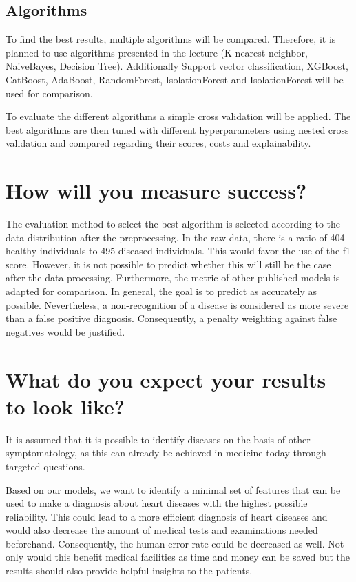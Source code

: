 \documentclass[11pt,titlepage,oneside,openany]{book}
\begin{document}
\subsection{Algorithms}

To find the best results, multiple algorithms will be compared. Therefore, it is planned to use algorithms presented in the lecture (K-nearest neighbor, NaiveBayes, Decision Tree). Additionally Support vector classification, XGBoost, CatBoost, AdaBoost, RandomForest, IsolationForest and IsolationForest  will be used for comparison.

To evaluate the different algorithms a simple cross validation will be applied. The best algorithms are then tuned with different hyperparameters using nested cross validation and compared regarding their scores, costs and explainability. 

\section{How will you measure success?}
\label{sec:success}

The evaluation method to select the best algorithm is selected according to the data distribution after the  preprocessing. In the raw data, there is a ratio of 404 healthy individuals to 495 diseased individuals. This would favor the use of the f1 score. However, it is not possible to predict whether this will still be the case after the data processing. 
Furthermore, the metric of other published models is adapted for  comparison. 
In general, the goal is to predict as accurately as possible. Nevertheless, a non-recognition of a disease is considered as more severe than a false positive diagnosis. Consequently, a penalty weighting against false negatives would be justified.

\newpage
\section{What do you expect your results to look like?}
\label{sec:results}

It is assumed that it is possible to identify diseases on the basis of other symptomatology, as this can already be achieved in medicine today through targeted questions. 

Based on our models, we want to identify a minimal set of features that can be used to make a diagnosis about heart diseases with the highest possible reliability. This could lead to a more efficient diagnosis of heart diseases and would also decrease the amount of medical tests and examinations needed beforehand. Consequently, the human error rate could be decreased as well. 
Not only would this benefit medical facilities as time and money can be saved but the results should also provide helpful insights to the patients.
\end{document}
